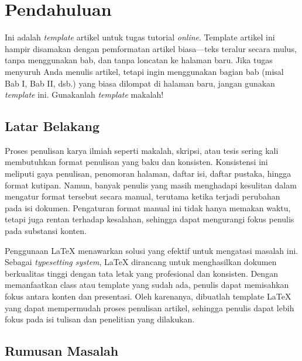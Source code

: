 \section{Pendahuluan}


Ini adalah \textit{template} artikel untuk tugas tutorial \textit{online}. Template artikel ini hampir disamakan dengan pemformatan artikel biasa---teks teralur secara mulus, tanpa menggunakan bab, dan tanpa loncatan ke halaman baru. Jika tugas menyuruh Anda menulis artikel, tetapi ingin menggunakan bagian bab (misal Bab I, Bab II, dsb.) yang biasa dilompat di halaman baru, jangan gunakan \textit{template} ini. Gunakanlah \textit{template} makalah!

\subsection{Latar Belakang}

Proses penulisan karya ilmiah seperti makalah, skripsi, atau tesis sering kali membutuhkan format penulisan yang baku dan konsisten. Konsistensi ini meliputi gaya penulisan, penomoran halaman, daftar isi, daftar pustaka, hingga format kutipan. Namun, banyak penulis yang masih menghadapi kesulitan dalam mengatur format tersebut secara manual, terutama ketika terjadi perubahan pada isi dokumen. Pengaturan format manual ini tidak hanya memakan waktu, tetapi juga rentan terhadap kesalahan, sehingga dapat mengurangi fokus penulis pada substansi konten.

Penggunaan LaTeX menawarkan solusi yang efektif untuk mengatasi masalah ini. Sebagai \textit{typesetting system}, LaTeX dirancang untuk menghasilkan dokumen berkualitas tinggi dengan tata letak yang profesional dan konsisten. Dengan memanfaatkan class atau template yang sudah ada, penulis dapat memisahkan fokus antara konten dan presentasi. Oleh karenanya, dibuatlah template LaTeX yang dapat mempermudah proses penulisan artikel, sehingga penulis dapat lebih fokus pada isi tulisan dan penelitian yang dilakukan.

\subsection{Rumusan Masalah}

